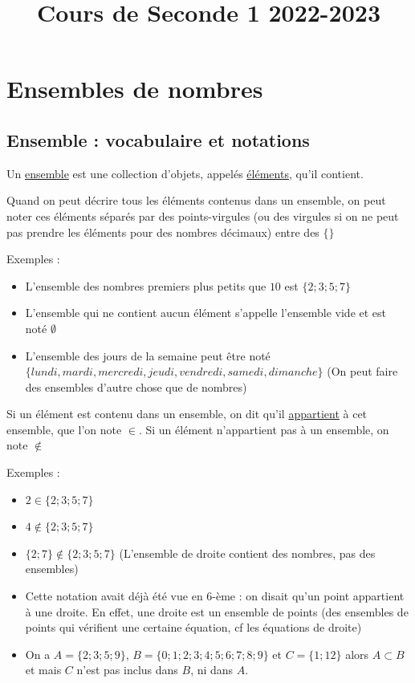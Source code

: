 \documentclass[10pt,a4paper]{book}
\title{Cours de Seconde 1 2022-2023}
\date{}
\begin{document}
\maketitle
\tableofcontents
\chapter{Ensembles de nombres}

\section{Ensemble : vocabulaire et notations}

\begin{de}
    Un \underline{ensemble} est une collection d'objets, appelés \underline{éléments}, qu'il contient. 
\end{de}

Quand on peut décrire tous les éléments contenus dans un ensemble, on peut noter ces éléments séparés par des points-virgules (ou des virgules si on ne peut pas prendre les éléments pour des nombres décimaux) entre des $\{\}$

Exemples : 
\begin{itemize}
    \item L'ensemble des nombres premiers plus petits que $10$ est $\{2;3;5;7\}$
    \item L'ensemble qui ne contient aucun élément s'appelle l'ensemble vide et est noté $\emptyset$
    \item L'ensemble des jours de la semaine peut être noté $\{lundi, mardi, mercredi, jeudi, vendredi, samedi, dimanche\}$  (On peut faire des ensembles d'autre chose que de nombres)
\end{itemize}


\begin{de}
    Si un élément est contenu dans un ensemble, on dit qu'il \underline{appartient} à cet ensemble, que l'on note $\in$.
    Si un élément n'appartient pas à un ensemble, on note $\notin$ 
\end{de}



Exemples : 
\begin{itemize}
    \item $2 \in \{2;3;5;7\}$ 
    \item $4 \notin \{2;3;5;7\}$
    \item $\{2;7\} \notin \{2;3;5;7\}$  (L'ensemble de droite contient des nombres, pas des ensembles)
    \item Cette notation avait déjà été vue en $6$-ème : on disait qu'un point appartient à une droite. En effet, une droite est un ensemble de points (des ensembles de points qui vérifient une certaine équation, cf les équations de droite)
    \item On a $A=\{2;3;5;9\}$, $B=\{0;1;2;3;4;5;6;7;8;9\}$ et $C=\{1;12\}$ alors $A\subset B$ 
  et mais $C$ n'est pas inclus dans $B$, ni dans $A$.
\end{itemize}
\end{document}
